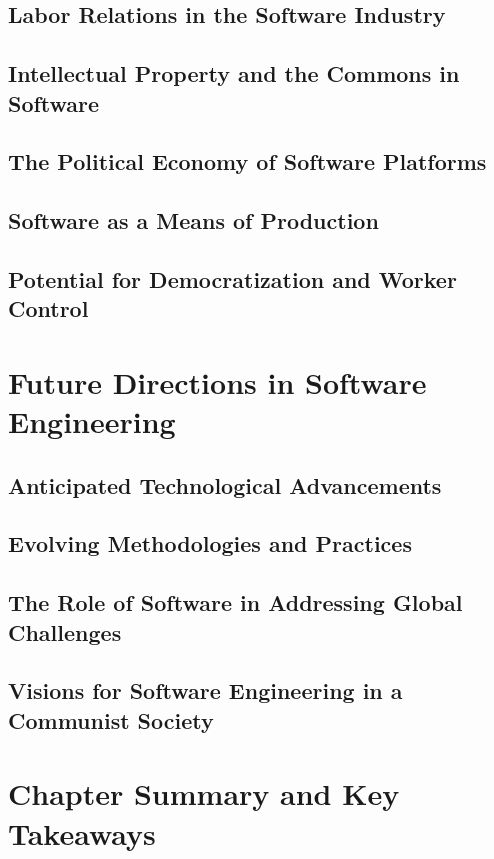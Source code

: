 \begin{refsection}
\subsection{Labor Relations in the Software Industry}
\subsection{Intellectual Property and the Commons in Software}
\subsection{The Political Economy of Software Platforms}
\subsection{Software as a Means of Production}
\subsection{Potential for Democratization and Worker Control}

\newpage

\section{Future Directions in Software Engineering}
\subsection{Anticipated Technological Advancements}
\subsection{Evolving Methodologies and Practices}
\subsection{The Role of Software in Addressing Global Challenges}
\subsection{Visions for Software Engineering in a Communist Society}

\newpage

\section{Chapter Summary and Key Takeaways}

\printbibliography[heading=subbibliography]
\end{refsection}